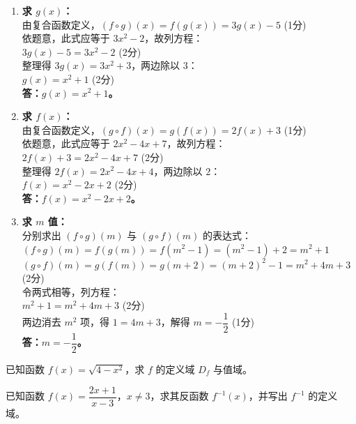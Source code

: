\documentclass[12pt,a4paper]{exam-zh}
\newcommand{\qscore}[1]{%
    \unskip\nobreak\hfill
    \makebox[0pt][l]{\makebox[4em][r]{(#1\%)}}%
}
\begin{document}
\begin{solution}
    \begin{enumerate}[label=(\alph*)]
        \item \textbf{求 $g(x)$：} \\
        由复合函数定义，$(f \circ g)(x) = f(g(x)) = 3g(x) - 5$ \hfill (1分) \\
        依题意，此式应等于 $3x^2 - 2$，故列方程： \\
        $3g(x) - 5 = 3x^2 - 2$ \hfill (2分) \\
        整理得 $3g(x) = 3x^2 + 3$，两边除以 $3$： \\
        $g(x) = x^2 + 1$ \hfill (2分) \\
        \textbf{答：$g(x) = x^2 + 1$。}

        \item \textbf{求 $f(x)$：} \\
        由复合函数定义，$(g \circ f)(x) = g(f(x)) = 2f(x) + 3$ \hfill (1分) \\
        依题意，此式应等于 $2x^2 - 4x + 7$，故列方程： \\
        $2f(x) + 3 = 2x^2 - 4x + 7$ \hfill (2分) \\
        整理得 $2f(x) = 2x^2 - 4x + 4$，两边除以 $2$： \\
        $f(x) = x^2 - 2x + 2$ \hfill (2分) \\
        \textbf{答：$f(x) = x^2 - 2x + 2$。}

        \item \textbf{求 $m$ 值：} \\
        分别求出 $(f \circ g)(m)$ 与 $(g \circ f)(m)$ 的表达式： \\
        $(f \circ g)(m) = f(g(m)) = f(m^2 - 1) = (m^2 - 1) + 2 = m^2 + 1$ \\
        $(g \circ f)(m) = g(f(m)) = g(m + 2) = (m + 2)^2 - 1 = m^2 + 4m + 3$ \hfill (2分) \\
        令两式相等，列方程： \\
        $m^2 + 1 = m^2 + 4m + 3$ \hfill (2分) \\
        两边消去 $m^2$ 项，得 $1 = 4m + 3$，解得 $m = -\dfrac{1}{2}$ \hfill (1分) \\
        \textbf{答：$m = -\dfrac{1}{2}$。}
    \end{enumerate}
\end{solution}

\begin{question}[points = 12]
    \begin{questionparts}
        \item 已知函数 $f(x) = \sqrt{4 - x^2}$，求 $f$ 的定义域 $D_f$ 与值域。 \qscore{4}

        \item 已知函数 $f(x) = \dfrac{2x + 1}{x - 3}$，$x \neq 3$，求其反函数 $f^{-1}(x)$，并写出 $f^{-1}$ 的定义域。 \qscore{6}
    \end{questionparts}
\end{question}
\end{document}
